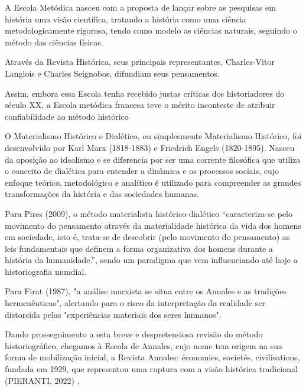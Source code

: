 A Escola Metódica nasceu com a proposta de  lançar sobre as pesquisas em história uma visão científica, tratando a história como uma ciência metodologicamente rigorosa, tendo como modelo as ciências naturais, seguindo o método das ciências físicas.

Através da Revista Histórica, seus principais representantes, Charles-Vitor Langlois e Charles Seignobos, difundiam seus pensamentos.


\noindent\begin{center}\mbox{\centering{}}\end{center}


Assim, embora essa Escola tenha recebido justas críticas dos historiadores do século XX, a Escola metódica francesa teve o mérito inconteste de atribuir confiabilidade ao método histórico

O Materialismo Histórico e Dialético, ou simplesmente Materialismo Histórico, foi desenvolvido  por Karl Marx (1818-1883) e Friedrich Engels (1820-1895). Nasceu da oposição ao idealismo e se diferencia por ser uma corrente filosófica que utiliza o conceito de dialética para entender a dinâmica e os processos sociais, cujo enfoque teórico, metodológico e analítico é utilizado para compreender as grandes transformações da história e das sociedades humanas.

Para  Pires (2009), o método materialista histórico-dialético “caracteriza-se pelo movimento do pensamento através da materialidade histórica da vida dos homens em sociedade, isto é, trata-se de descobrir (pelo movimento do pensamento) as leis fundamentais que definem a forma organizativa dos homens durante a história da humanidade.”, sendo um paradigma que vem influenciando até hoje a historiografia mundial.

Para Firat (1987), "a análise marxista se situa entre os Annales e as tradições hermenêuticas", alertando para o risco da interpretação da realidade ser distorcida pelas "experiências materiais dos seres humanos".

Dando prosseguimento a esta breve e despretensiosa revisão do método historiográfico, chegamos à Escola de Annales, cujo nome tem origem na sua forma de mobilização inicial, a Revista Annales: économies, societés, civilisations, fundada em 1929, que representou uma ruptura com a visão histórica tradicional (PIERANTI, 2022) .

